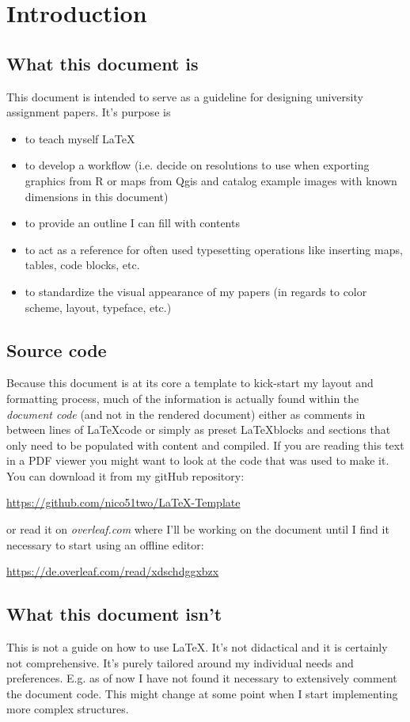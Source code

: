 \section{Introduction}
\label{sec:Int}
\subsection{What this document is}
This document is intended to serve as a guideline for designing university assignment papers. It's purpose is
\begin{itemize}
  \item to teach myself \LaTeX 
  \item to develop a workflow (i.e. decide on resolutions to use when exporting graphics from R or maps from Qgis and catalog example images with known dimensions in this document)
  \item to provide an outline I can fill with contents
  \item to act as a reference for often used typesetting operations like inserting maps, tables, code blocks, etc.
  \item to standardize the visual appearance of my papers (in regards to color scheme, layout, typeface, etc.)
\end{itemize}
\subsection{Source code}
Because this document is at its core a template to kick-start my layout and formatting process, much of the information is actually found within the \textit{document code} (and not in the rendered document) either as comments in between lines of \LaTeX code or simply as preset \LaTeX blocks and sections that only need to be populated with content and compiled. If you are reading this text in a PDF viewer you might want to look at the code that was used to make it. You can download it from my gitHub repository:

\url{https://github.com/nico51two/LaTeX-Template}

or read it on \textit{overleaf.com} where I'll be working on the document until I find it necessary to start using an offline editor:

\url{https://de.overleaf.com/read/xdschdggxbzx}
\subsection{What this document isn't}
This is not a guide on how to use \LaTeX. It's not didactical and it is certainly not comprehensive. It's purely tailored around my individual needs and preferences. E.g. as of now I have not found it necessary to extensively comment the document code. This might change at some point when I start implementing more complex structures.